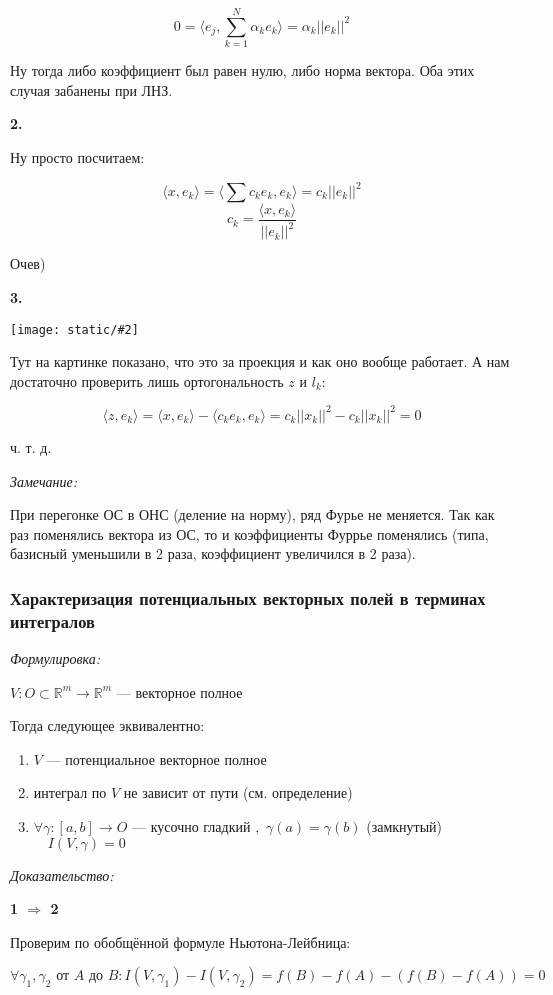 \documentclass{article}
\def\dbl{\,\,}
\def\images#1#2{\begin{center}\texttt{[image: static/\#2]}\end{center}}
\def\sk#1#2{\langle #1, #2 \rangle}
\begin{document}
\[0 = \sk{e_j}{\sum_{k = 1}^{N} \alpha_k e_k} = \alpha_k ||e_k||^2\]

Ну тогда либо коэффициент был равен нулю, либо норма вектора. Оба этих случая забанены при ЛНЗ.

\textbf{2.}

Ну просто посчитаем:

\[\sk{x}{e_k} = \sk{\sum c_k e_k}{e_k} = c_k ||e_k||^2\]
\[c_k = \frac{\sk{x}{e_k}}{||e_k||^2}\]

Очев)

\textbf{3.}

\images{0.3}{ort_sys.jpg}

Тут на картинке показано, что это за проекция и как оно вообще работает. А нам достаточно проверить лишь ортогональность $z$ и $l_k$:

\[\sk{z}{e_k} = \sk{x}{e_k} - \sk{c_ke_k}{e_k} = c_k ||x_k||^2 - c_k ||x_k||^2 = 0\]

ч. т. д. 

\textit{Замечание:}

При перегонке ОС в ОНС (деление на норму), ряд Фурье не меняется. Так как раз поменялись вектора из ОС, то и коэффициенты Фуррье поменялись (типа, базисный уменьшили в 2 раза, коэффициент увеличился в 2 раза).

\subsubsection{Характеризация потенциальных векторных полей в терминах интегралов}
\textit{Формулировка:}

$V: O \subset \mathbb{R}^m \rightarrow \mathbb{R}^m$ --- векторное полное

Тогда следующее эквивалентно:

\begin{enumerate}
    \item $V$ --- потенциальное векторное полное
    \item интеграл по $V$ не зависит от пути (см. определение)
    \item $\forall \gamma : [a, b] \rightarrow O$ --- кусочно гладкий $, \dbl \gamma(a) = \gamma(b) $ (замкнутый) $ \quad I(V, \gamma) = 0$
\end{enumerate}

\textit{Доказательство:}

\textbf{1 $\Rightarrow$ 2}

Проверим по обобщённой формуле Ньютона-Лейбница:

\[\forall \gamma_1, \gamma_2 \text{ от } A \text{ до } B: I(V, \gamma_1) - I(V, \gamma_2) = f(B) - f(A) - (f(B) - f(A)) = 0\]
\end{document}
